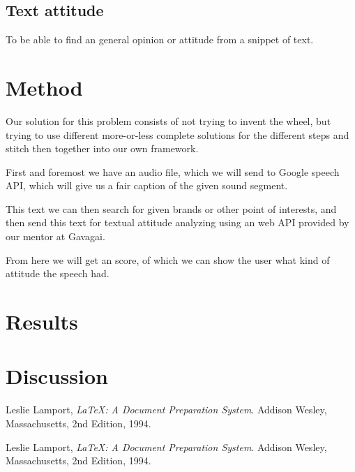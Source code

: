 \documentclass[a4paper,11pt,twoside]{ltxdoc}
\begin{document}
\subsection{Text attitude}
To be able to find an general opinion or attitude from a snippet of text.

\section{Method}
Our solution for this problem consists of not trying to invent the wheel, but trying to use different more-or-less complete solutions for the different steps and stitch then together into our own framework.

First and foremost we have an audio file, which we will send to Google speech API, which will give us a fair caption of the given sound segment.

This text we can then search for given brands or other point of interests, and then send this text for textual attitude analyzing using an web API provided by our mentor at Gavagai.

From here we will get an score, of which we can show the user what kind of attitude the speech had. 

\section{Results}


\section{Discussion}


\newpage
\begin{thebibliography}{9}

  Leslie Lamport,
  \emph{\LaTeX: A Document Preparation System}.
  Addison Wesley, Massachusetts,
  2nd Edition,
  1994.

  Leslie Lamport,
  \emph{\LaTeX: A Document Preparation System}.
  Addison Wesley, Massachusetts,
  2nd Edition,
  1994.


\end{thebibliography}
\end{document}
